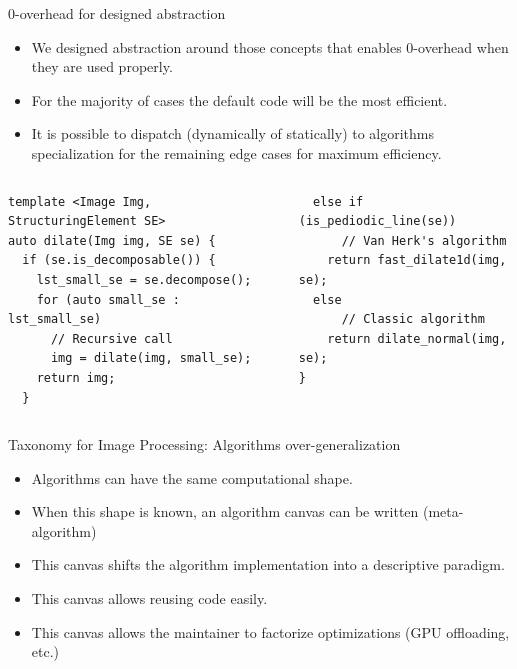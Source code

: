 \documentclass[12pt,aspectratio=169]{beamer}
\begin{document}
\begin{frame}[fragile]{0-overhead for designed abstraction}
  \begin{itemize}
    \item We designed abstraction around those concepts that enables 0-overhead when they are used properly.
    \item For the majority of cases the default code will be the most efficient.
    \item It is possible to dispatch (dynamically of statically) to algorithms specialization for the remaining edge
          cases for maximum efficiency.
  \end{itemize}
  \begin{columns}[T,onlytextwidth]
    \begin{verbatim}
template <Image Img, StructuringElement SE>
auto dilate(Img img, SE se) {
  if (se.is_decomposable()) {
    lst_small_se = se.decompose();
    for (auto small_se : lst_small_se)
      // Recursive call
      img = dilate(img, small_se);
    return img;
  }
    \end{verbatim}

    \begin{verbatim}
  else if (is_pediodic_line(se))
      // Van Herk's algorithm
    return fast_dilate1d(img, se);
  else
      // Classic algorithm
    return dilate_normal(img, se);
}
    \end{verbatim}

  \end{columns}
\end{frame}


\begin{frame}[fragile]{Taxonomy for Image Processing: Algorithms over-generalization}
  \begin{itemize}
    \item Algorithms can have the same computational shape.
    \item When this shape is known, an algorithm canvas can be written (meta-algorithm)
    \item This canvas shifts the algorithm implementation into a descriptive paradigm.
    \item This canvas allows reusing code easily.
    \item This canvas allows the maintainer to factorize optimizations (GPU offloading, etc.)
  \end{itemize}
\end{frame}
\end{document}

